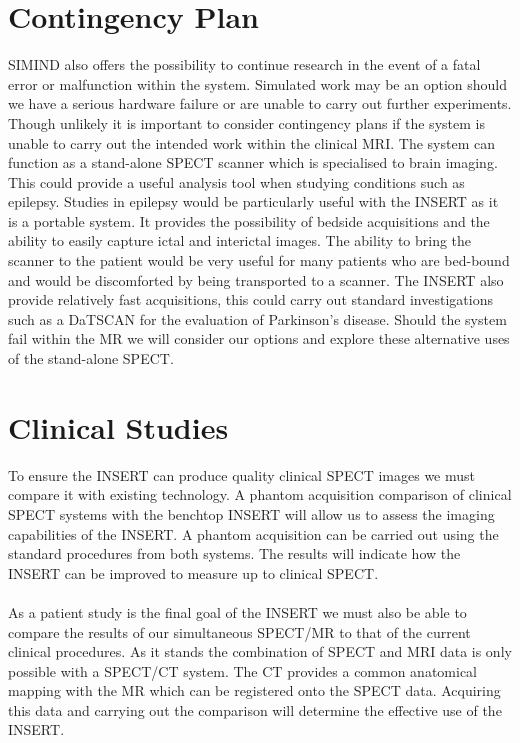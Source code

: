 \paragraph{}
\section{Contingency Plan}
SIMIND also offers the possibility to continue research in the event of a fatal error or malfunction within the system. Simulated work may be an option should we have a serious hardware failure or are unable to carry out further experiments. Though unlikely it is important to consider contingency plans if the system is unable to carry out the intended work within the clinical \acrshort{MRI}. The system can function as a stand-alone \acrshort{SPECT} scanner which is specialised to brain imaging. This could provide a useful analysis tool when studying conditions such as epilepsy. Studies in epilepsy would be particularly useful with the \acrshort{INSERT} as it is a portable system. It provides the possibility of bedside acquisitions and the ability to easily capture ictal and interictal images. The ability to bring the scanner to the patient would be very useful for many patients who are bed-bound and would be discomforted by being transported to a scanner. The \acrshort{INSERT} also provide relatively fast acquisitions, this could carry out standard investigations such as a DaTSCAN for the evaluation of Parkinson's disease. Should the system fail within the \acrshort{MR} we will consider our options and explore these alternative uses of the stand-alone \acrshort{SPECT}. 

\section{Clinical Studies}
To ensure the \acrshort{INSERT} can produce quality clinical \acrshort{SPECT} images we must compare it with existing technology. A phantom acquisition comparison of clinical \acrshort{SPECT} systems with the benchtop \acrshort{INSERT} will allow us to assess the imaging capabilities of the INSERT. A phantom acquisition can be carried out using the standard procedures from both systems. The results will indicate how the \acrshort{INSERT} can be improved to measure up to clinical \acrshort{SPECT}.
\paragraph{}
As a patient study is the final goal of the \acrshort{INSERT} we must also be able to compare the results of our simultaneous \acrshort{SPECT/MR} to that of the current clinical procedures. As it stands the combination of \acrshort{SPECT} and \acrshort{MRI} data is only possible with a \acrshort{SPECT/CT} system. The \acrshort{CT} provides a common anatomical mapping with the \acrshort{MR} which can be registered onto the \acrshort{SPECT} data. Acquiring this data and carrying out the comparison will determine the effective use of the \acrshort{INSERT}. 
